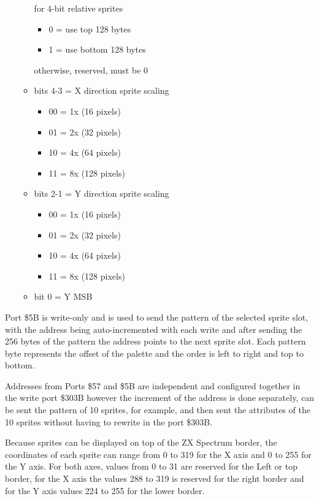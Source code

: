 \begin{enumerate}
\begin{itemize}
    for 4-bit relative sprites
    \begin{itemize}
    \item 0 = use top 128 bytes
    \item 1 = use bottom 128 bytes
    \end{itemize}
    otherwise, reserved, must be 0	
  \item bits 4-3 = X direction sprite scaling
    \begin{itemize}
    \item 00 = 1x (16 pixels)
    \item 01 = 2x (32 pixels)
    \item 10 = 4x (64 pixels)
    \item 11 = 8x (128 pixels)
    \end{itemize}
  \item bits 2-1 = Y direction sprite scaling
    \begin{itemize}
    \item 00 = 1x (16 pixels)
    \item 01 = 2x (32 pixels)
    \item 10 = 4x (64 pixels)
    \item 11 = 8x (128 pixels)
    \end{itemize}
  \item bit 0 = Y MSB
  \end{itemize}
\end{enumerate}

Port \$5B is write-only and is used to send the pattern of the
selected sprite slot, with the address being auto-incremented with
each write and after sending the 256 bytes of the pattern the address
points to the next sprite slot. Each pattern byte represents the
offset of the palette and the order is left to right and top to
bottom.

Addresses from Ports \$57 and \$5B are independent and configured
together in the write port \$303B however the increment of the address
is done separately, can be sent the pattern of 10 sprites, for
example, and then sent the attributes of the 10 sprites without having
to rewrite in the port \$303B.

Because sprites can be displayed on top of the ZX Spectrum border, the
coordinates of each sprite can range from 0 to 319 for the X axis and
0 to 255 for the Y axis. For both axes, values from 0 to 31 are
reserved for the Left or top border, for the X axis the values 288 to
319 is reserved for the right border and for the Y axis values 224 to
255 for the lower border.

